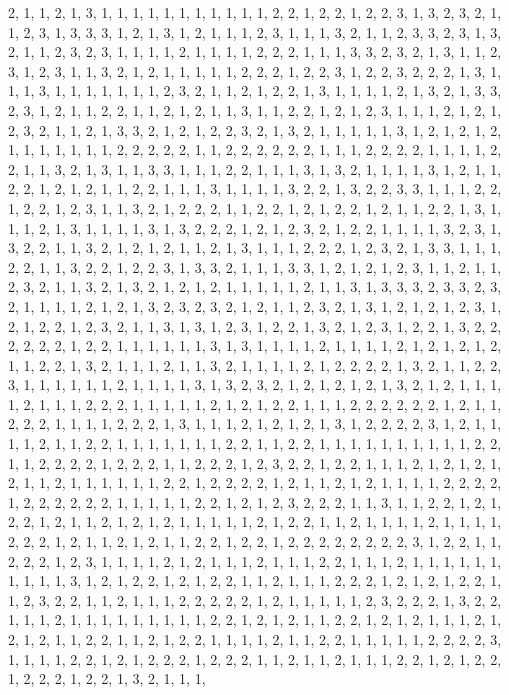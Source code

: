\documentclass[
]{article}
\begin{document}
\begin{Schunk}
\begin{Soutput}
2, 1, 1, 2, 1, 3, 1, 1, 1, 1, 1, 1, 1, 1, 1, 1, 1, 2, 2, 1, 2, 2, 1, 2, 2, 3, 1, 3, 2, 3, 2, 1, 1, 2, 3, 1, 3, 3, 3, 1, 2, 1, 3, 1, 2, 1, 1, 1, 2, 3, 1, 1, 1, 3, 2, 1, 1, 2, 3, 3, 2, 3, 1, 3, 2, 1, 1, 2, 3, 2, 3, 1, 1, 1, 1, 2, 1, 1, 1, 1, 2, 2, 2, 1, 1, 1, 3, 3, 2, 3, 2, 1, 3, 1, 1, 2, 3, 1, 2, 3, 1, 1, 3, 2, 1, 2, 1, 1, 1, 1, 1, 2, 2, 2, 1, 2, 2, 3, 1, 2, 2, 3, 2, 2, 2, 1, 3, 1, 1, 1, 3, 1, 1, 1, 1, 1, 1, 1, 2, 3, 2, 1, 1, 2, 1, 2, 2, 1, 3, 1, 1, 1, 1, 2, 1, 3, 2, 1, 3, 3, 2, 3, 1, 2, 1, 1, 2, 2, 1, 1, 2, 1, 2, 1, 1, 3, 1, 1, 2, 2, 1, 2, 1, 2, 3, 1, 1, 1, 2, 1, 2, 1, 2, 3, 2, 1, 1, 2, 1, 3, 3, 2, 1, 2, 1, 2, 2, 3, 2, 1, 3, 2, 1, 1, 1, 1, 1, 3, 1, 2, 1, 2, 1, 2, 1, 1, 1, 1, 1, 1, 1, 2, 2, 2, 2, 2, 1, 1, 2, 2, 2, 2, 2, 2, 1, 1, 1, 2, 2, 2, 2, 1, 1, 1, 1, 2, 2, 1, 1, 3, 2, 1, 3, 1, 1, 3, 3, 1, 1, 1, 2, 2, 1, 1, 1, 3, 1, 3, 2, 1, 1, 1, 1, 3, 1, 2, 1, 1, 2, 2, 1, 2, 1, 2, 1, 1, 2, 2, 1, 1, 1, 3, 1, 1, 1, 1, 3, 2, 2, 1, 3, 2, 2, 3, 3, 1, 1, 1, 2, 2, 1, 2, 2, 1, 2, 3, 1, 1, 3, 2, 1, 2, 2, 2, 1, 1, 2, 2, 1, 2, 1, 2, 2, 1, 2, 1, 1, 2, 2, 1, 3, 1, 1, 1, 2, 1, 3, 1, 1, 1, 1, 3, 1, 3, 2, 2, 2, 1, 2, 1, 2, 3, 2, 1, 2, 2, 1, 1, 1, 1, 3, 2, 3, 1, 3, 2, 2, 1, 1, 3, 2, 1, 2, 1, 2, 1, 1, 2, 1, 3, 1, 1, 1, 2, 2, 2, 1, 2, 3, 2, 1, 3, 3, 1, 1, 1, 2, 2, 1, 1, 3, 2, 2, 1, 2, 2, 3, 1, 3, 3, 2, 1, 1, 1, 3, 3, 1, 2, 1, 2, 1, 2, 3, 1, 1, 2, 1, 1, 2, 3, 2, 1, 1, 3, 2, 1, 3, 2, 1, 2, 1, 2, 1, 1, 1, 1, 1, 2, 1, 1, 3, 1, 3, 3, 3, 2, 3, 3, 2, 3, 2, 1, 1, 1, 1, 2, 1, 2, 1, 3, 2, 3, 2, 3, 2, 1, 2, 1, 1, 2, 3, 2, 1, 3, 1, 2, 1, 2, 1, 2, 3, 1, 2, 1, 2, 2, 1, 2, 3, 2, 1, 1, 3, 1, 3, 1, 2, 3, 1, 2, 2, 1, 3, 2, 1, 2, 3, 1, 2, 2, 1, 3, 2, 2, 2, 2, 2, 2, 1, 2, 2, 1, 1, 1, 1, 1, 1, 3, 1, 3, 1, 1, 1, 1, 2, 1, 1, 1, 1, 2, 1, 2, 1, 2, 1, 2, 1, 1, 2, 2, 1, 3, 2, 1, 1, 1, 2, 1, 1, 3, 2, 1, 1, 1, 1, 2, 1, 2, 2, 2, 2, 1, 3, 2, 1, 1, 2, 2, 3, 1, 1, 1, 1, 1, 1, 2, 1, 1, 1, 1, 3, 1, 3, 2, 3, 2, 1, 2, 1, 2, 1, 2, 1, 3, 2, 1, 2, 1, 1, 1, 1, 2, 1, 1, 1, 2, 2, 2, 1, 1, 1, 1, 1, 2, 1, 2, 1, 2, 2, 1, 1, 1, 2, 2, 2, 2, 2, 2, 1, 2, 1, 1, 2, 2, 2, 1, 1, 1, 1, 2, 2, 2, 1, 3, 1, 1, 1, 2, 1, 2, 1, 2, 1, 3, 1, 2, 2, 2, 2, 3, 1, 2, 1, 1, 1, 1, 2, 1, 1, 2, 2, 1, 1, 1, 1, 1, 1, 1, 2, 2, 1, 1, 2, 2, 1, 1, 1, 1, 1, 1, 1, 1, 1, 1, 2, 2, 1, 1, 2, 2, 2, 2, 1, 2, 2, 2, 1, 1, 2, 2, 2, 1, 2, 3, 2, 2, 1, 2, 2, 1, 1, 1, 2, 1, 2, 1, 2, 1, 2, 1, 1, 2, 1, 1, 1, 1, 1, 1, 2, 2, 1, 2, 2, 2, 2, 1, 2, 1, 1, 2, 1, 2, 1, 1, 1, 1, 2, 2, 2, 2, 1, 2, 2, 2, 2, 2, 2, 1, 1, 1, 1, 1, 2, 2, 1, 2, 1, 2, 3, 2, 2, 2, 1, 1, 3, 1, 1, 2, 2, 1, 2, 1, 2, 2, 1, 2, 1, 1, 2, 1, 2, 1, 2, 1, 1, 1, 1, 1, 2, 1, 2, 2, 1, 1, 2, 1, 1, 1, 1, 2, 1, 1, 1, 1, 2, 2, 2, 1, 2, 1, 1, 2, 1, 2, 1, 1, 2, 2, 1, 2, 2, 1, 2, 2, 2, 2, 2, 2, 2, 2, 3, 1, 2, 2, 1, 1, 2, 2, 2, 1, 2, 3, 1, 1, 1, 1, 2, 1, 2, 1, 1, 1, 2, 1, 1, 1, 2, 2, 1, 1, 1, 2, 1, 1, 1, 1, 1, 1, 1, 1, 1, 1, 3, 1, 2, 1, 2, 2, 1, 2, 1, 2, 2, 1, 1, 2, 1, 1, 1, 2, 2, 2, 1, 2, 1, 2, 1, 2, 2, 1, 1, 2, 3, 2, 2, 1, 1, 2, 1, 1, 1, 2, 2, 2, 2, 2, 1, 2, 1, 1, 1, 1, 1, 2, 3, 2, 2, 2, 1, 3, 2, 2, 1, 1, 1, 2, 1, 1, 1, 1, 1, 1, 1, 1, 1, 2, 2, 1, 2, 1, 2, 1, 1, 2, 2, 1, 2, 1, 2, 1, 1, 1, 2, 1, 2, 1, 2, 1, 1, 2, 2, 1, 1, 2, 1, 2, 2, 1, 1, 1, 1, 2, 1, 1, 2, 2, 1, 1, 1, 1, 1, 2, 2, 2, 2, 3, 1, 1, 1, 1, 2, 2, 1, 2, 1, 2, 2, 2, 1, 2, 2, 2, 1, 1, 2, 1, 1, 2, 1, 1, 1, 2, 2, 1, 2, 1, 2, 2, 1, 2, 2, 2, 1, 2, 2, 1, 3, 2, 1, 1, 1, 
\end{Soutput}
\end{Schunk}
\end{document}
